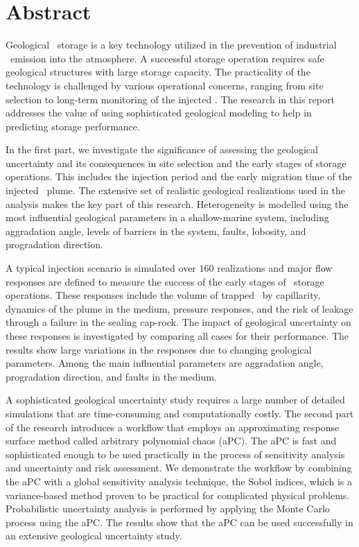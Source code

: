\chapter{Abstract}
Geological \coo\ storage is a key technology utilized in the prevention of industrial
\coo\ emission into the atmosphere. A successful storage operation requires safe geological structures with large storage capacity. The practicality of the technology is challenged by various operational concerns, ranging from site selection to long-term monitoring of the injected \coo.
The research in this report addresses the value  of using sophisticated geological modeling to help in predicting storage performance. 

In the first part, we investigate the significance of assessing the geological uncertainty and its consequences in site selection and the early stages of storage operations. This includes the injection period and the early migration time of the injected \coo\ plume. The extensive set of realistic geological realizations used in the analysis makes the key part of this research. Heterogeneity is modelled using the most influential geological parameters in a shallow-marine system, including aggradation angle, levels of barriers in the system, faults, lobosity, and progradation direction.

A typical injection scenario is simulated over $160$ realizations and major flow responses are defined to measure the success of the early stages of \coo\ storage operations. These responses include the volume of trapped \coo\ by capillarity, dynamics of the plume in the medium, pressure responses, and the risk of leakage through a failure in the sealing cap-rock. The impact of geological uncertainty on these responses is investigated by comparing all cases for their performance. The results show large variations in the responses due to changing geological parameters. Among the main influential parameters are aggradation angle, progradation direction, and faults in the medium.

A sophisticated geological uncertainty study requires a large number of detailed simulations that are time-consuming and computationally costly. The second part of the research introduces a workflow that employs an approximating response surface method called arbitrary polynomial chaos (aPC). The aPC is fast and sophisticated enough to be used practically in the process of sensitivity analysis and uncertainty and risk assessment. We demonstrate the workflow by combining the aPC with a global sensitivity analysis technique, the Sobol indices, which is a variance-based
method proven to be practical for complicated physical problems. Probabilistic uncertainty analysis is performed by applying the Monte Carlo process using the aPC. The results show that the aPC can be used successfully in an extensive geological uncertainty study.
